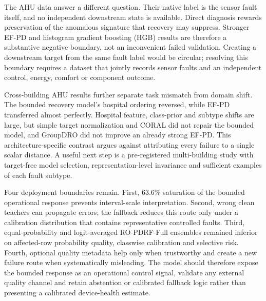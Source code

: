 \documentclass[11pt]{article}
\begin{document}
The AHU data answer a different question. Their native label is the sensor fault itself, and no independent downstream state is available. Direct diagnosis rewards preservation of the anomalous signature that recovery may suppress. Stronger EF-PD and histogram gradient boosting (HGB) results are therefore a substantive negative boundary, not an inconvenient failed validation. Creating a downstream target from the same fault label would be circular; resolving this boundary requires a dataset that jointly records sensor faults and an independent control, energy, comfort or component outcome.

Cross-building AHU results further separate task mismatch from domain shift. The bounded recovery model's hospital ordering reversed, while EF-PD transferred almost perfectly. Hospital feature, class-prior and subtype shifts are large, but simple target normalization and CORAL did not repair the bounded model, and GroupDRO did not improve an already strong EF-PD. This architecture-specific contrast argues against attributing every failure to a single scalar distance. A useful next step is a pre-registered multi-building study with target-free model selection, representation-level invariance and sufficient examples of each fault subtype.

Four deployment boundaries remain. First, 63.6\% saturation of the bounded operational response prevents interval-scale interpretation. Second, wrong clean teachers can propagate errors; the fallback reduces this route only under a calibration distribution that contains representative controlled faults. Third, equal-probability and logit-averaged RO-PDRF-Full ensembles remained inferior on affected-row probability quality, classwise calibration and selective risk. Fourth, optional quality metadata help only when trustworthy and create a new failure route when systematically misleading. The model should therefore expose the bounded response as an operational control signal, validate any external quality channel and retain abstention or calibrated fallback logic rather than presenting a calibrated device-health estimate.
\end{document}

